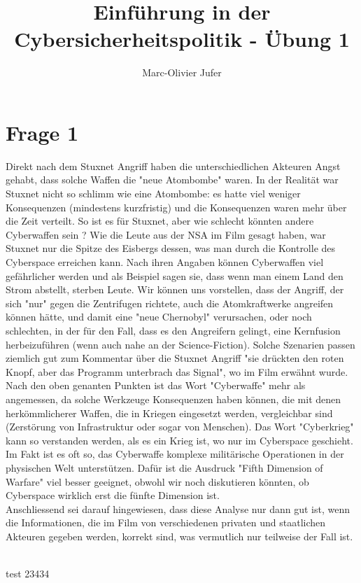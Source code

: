 \documentclass[10pt,a4paper]{article}
\author{Marc-Olivier Jufer}
\title{Einführung in der Cybersicherheitspolitik - Übung 1}
\begin{document}
	\maketitle

	\section*{Frage 1}
		Direkt nach dem Stuxnet Angriff haben die unterschiedlichen Akteuren Angst gehabt, dass solche Waffen die "neue Atombombe" waren. In der Realität war Stuxnet nicht so schlimm wie eine Atombombe: es hatte viel weniger Konsequenzen (mindestens kurzfristig) und die Konsequenzen waren mehr über die Zeit verteilt. So ist es für Stuxnet, aber wie schlecht könnten andere Cyberwaffen sein ? Wie die Leute aus der NSA im Film gesagt haben, war Stuxnet nur die Spitze des Eisbergs dessen, was man durch die Kontrolle des Cyberspace erreichen kann. Nach ihren Angaben können Cyberwaffen viel gefährlicher werden und als Beispiel sagen sie, dass wenn man einem Land den Strom abstellt, sterben Leute. Wir können uns vorstellen, dass der Angriff, der sich "nur" gegen die Zentrifugen richtete, auch die Atomkraftwerke angreifen können hätte, und damit eine "neue Chernobyl" verursachen, oder noch schlechten, in der für den Fall, dass es den Angreifern gelingt, eine Kernfusion herbeizuführen (wenn auch nahe an der Science-Fiction). Solche Szenarien passen ziemlich gut zum Kommentar über die Stuxnet Angriff "sie drückten den roten Knopf, aber das Programm unterbrach das Signal", wo im Film erwähnt wurde. \\
		
		Nach den oben genanten Punkten ist das Wort "Cyberwaffe" mehr als angemessen, da solche Werkzeuge Konsequenzen haben können, die mit denen herkömmlicherer Waffen, die in Kriegen eingesetzt werden, vergleichbar sind (Zerstörung von Infrastruktur oder sogar von Menschen). Das Wort "Cyberkrieg" kann so verstanden werden, als es ein Krieg ist, wo nur im Cyberspace geschieht. Im Fakt ist es oft so, das Cyberwaffe komplexe militärische Operationen in der physischen Welt unterstützen. Dafür ist die Ausdruck "Fifth Dimension of Warfare" viel besser geeignet, obwohl wir noch diskutieren könnten, ob Cyberspace wirklich erst die fünfte Dimension ist.\\
		
		
		
		Anschliessend sei darauf hingewiesen, dass diese Analyse nur dann gut ist, wenn die Informationen, die im Film von verschiedenen privaten und staatlichen Akteuren gegeben werden, korrekt sind, was vermutlich nur teilweise der Fall ist.


		\\
		test 23434
	
\end{document}
